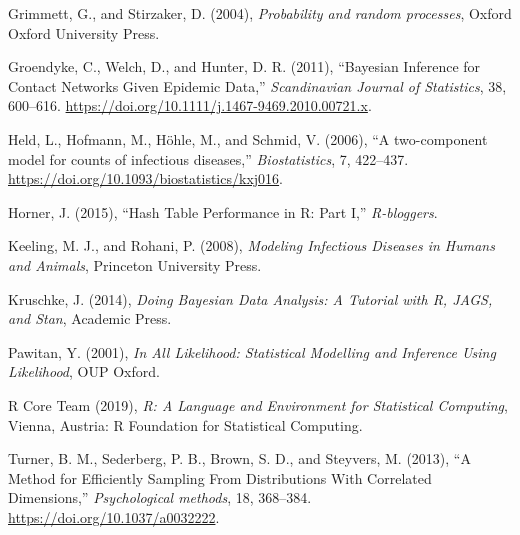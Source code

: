 \documentclass[11pt,a4paper]{article}
\numberwithin{equation}{section}
\begin{document}
\leavevmode\hypertarget{ref-grimmett_probability_2004}{}%
Grimmett, G., and Stirzaker, D. (2004), \emph{Probability and random
processes}, Oxford Oxford University Press.

\leavevmode\hypertarget{ref-groendyke_bayesian_2011}{}%
Groendyke, C., Welch, D., and Hunter, D. R. (2011), ``Bayesian Inference
for Contact Networks Given Epidemic Data,'' \emph{Scandinavian Journal
of Statistics}, 38, 600--616.
\url{https://doi.org/10.1111/j.1467-9469.2010.00721.x}.

\leavevmode\hypertarget{ref-held_two-component_2006}{}%
Held, L., Hofmann, M., Höhle, M., and Schmid, V. (2006), ``A
two-component model for counts of infectious diseases,''
\emph{Biostatistics}, 7, 422--437.
\url{https://doi.org/10.1093/biostatistics/kxj016}.

\leavevmode\hypertarget{ref-horner_hash_2015}{}%
Horner, J. (2015), ``Hash Table Performance in R: Part I,''
\emph{R-bloggers}.

\leavevmode\hypertarget{ref-keeling_modeling_2008}{}%
Keeling, M. J., and Rohani, P. (2008), \emph{Modeling Infectious
Diseases in Humans and Animals}, Princeton University Press.

\leavevmode\hypertarget{ref-kruschke_doing_2014}{}%
Kruschke, J. (2014), \emph{Doing Bayesian Data Analysis: A Tutorial with
R, JAGS, and Stan}, Academic Press.

\leavevmode\hypertarget{ref-pawitan_all_2001}{}%
Pawitan, Y. (2001), \emph{In All Likelihood: Statistical Modelling and
Inference Using Likelihood}, OUP Oxford.

\leavevmode\hypertarget{ref-r_core_team_r_2019}{}%
R Core Team (2019), \emph{R: A Language and Environment for Statistical
Computing}, Vienna, Austria: R Foundation for Statistical Computing.

\leavevmode\hypertarget{ref-turner_method_2013}{}%
Turner, B. M., Sederberg, P. B., Brown, S. D., and Steyvers, M. (2013),
``A Method for Efficiently Sampling From Distributions With Correlated
Dimensions,'' \emph{Psychological methods}, 18, 368--384.
\url{https://doi.org/10.1037/a0032222}.
\end{document}
